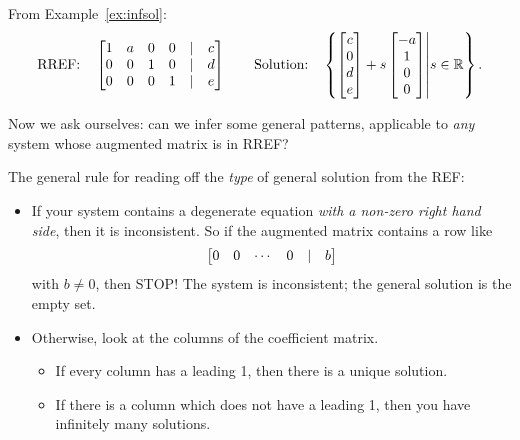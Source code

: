 
\begin{myexample} From Example~\ref{ex:infsol}:
$$
\text{RREF:} \quad \left[ \begin{matrix} 1 & a & 0 & 0 & | & c\\
0 & 0 & 1 & 0 & | & d\\
0 & 0 & 0 & 1 & | & e \end{matrix} \right] \qquad \text{Solution:}\quad \left\{ \left[ \begin{matrix} c\\0\\d\\e \end{matrix} \right]+s\left[ \begin{matrix} -a\\1\\0\\0 \end{matrix} \right] \middle| s\in \mathbb{R}\right\}.
$$
\end{myexample}

Now we ask ourselves: can we infer some general patterns, applicable to \emph{any} system whose augmented matrix is in RREF?

\medskip

The general rule for reading off the \emph{type} of general solution
from the REF:
\begin{itemize}
\item If your system contains a degenerate equation {\it with a non-zero right hand side}, then it is inconsistent.
So if the augmented matrix contains a row like
$$
\left[ \begin{matrix}  0 & 0 & \cdots & 0 &|& b \end{matrix} \right]
$$
with $b\neq 0$, then STOP!  The system is inconsistent; the general solution
is the empty set.

\item Otherwise, look at the columns of the coefficient matrix. 
\begin{itemize}
\item If every column has a leading 1, then there is a unique solution.
\item If there is a column which does not have a leading 1, then you
have infinitely many solutions.
\end{itemize}
\end{itemize}


